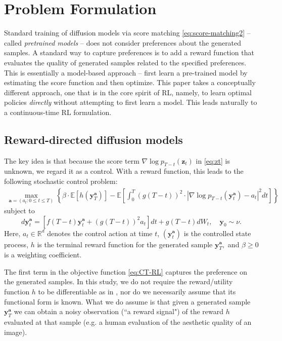 \documentclass[11pt]{article}
\begin{document}
\section{Problem Formulation}\label{sec:prob-sde}
Standard training of diffusion models via score matching \eqref{eq:score-matching2} -- called {\it pretrained models} -- does not consider preferences about the generated samples.
 A standard way to capture preferences is to add a reward function that evaluates the quality of generated samples related to the specified  preferences. This is essentially a model-based approach -- first learn a pre-trained model by estimating the score function and then optimize. This paper takes a conceptually different approach, one that is in the core spirit of RL, namely, to learn optimal policies {\it directly} without attempting to first learn a model. This leads naturally to a continuous-time RL formulation.







\subsection{Reward-directed diffusion models}


The  key idea is that because the score term $\nabla\log p_{T-t}(\mathbf{z}_{t})$ in
\eqref{eq:zt} is unknown, we regard it as a control. With a reward function, this leads to
the following stochastic control problem:
\begin{align}\label{eq:CT-RL}
\max_{{\mathbf{a}} = (a_t: 0 \le t \le T)}  \left\{ \beta \cdot \mathbb{E}[h( \mathbf{y}^{\mathbf{a}}_{T})] -  \mathbb{E} \left[ \int_0^T (g(T-t))^{2} \cdot {| \nabla\log p_{T-t}({\mathbf{y}}^{\mathbf{a}}_{t}) - a_t|^2} dt \right]  \right\}
\end{align}
subject to
\begin{equation}\label{eq:u-sys}
d\mathbf{y}^{\mathbf{a}}_{t}=\left[f(T-t)\mathbf{y}^{\mathbf{a}}_{t}+(g(T-t))^{2} a_t \right]dt
+g(T-t)d W_{t}, \quad \mathbf{y}_{0}\sim\nu.
\end{equation}
Here, $a_t \in \mathbb{R}^d$ denotes the control action at time $t$, $(\mathbf{y}^{\mathbf{a}}_{t})$ is the controlled state process, $h$ is the terminal reward function for the generated sample $ \mathbf{y}^{\mathbf{a}}_{T},$ and $\beta \ge 0$ is a weighting coefficient.

The first term in the objective function \eqref{eq:CT-RL} captures the preference on
the generated samples. In this study, we do not require the reward/utility function $h$ to be differentiable as in \cite{clark2023directly}, nor do we necessarily assume that its functional form is known. What we do assume is that given a generated sample $\mathbf{y}^{\mathbf{a}}_{T}$ we can obtain a noisy observation (``a reward signal") of the reward $h$ evaluated at that sample (e.g. a human evaluation of the aesthetic quality of an image).
\end{document}
